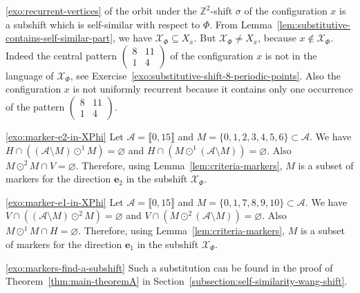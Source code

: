 \documentclass[12pt]{amsart}
\newcommand{\Z}{\mathbb{Z}}
\newcommand{\be}{{\boldsymbol{e}}}
\newcommand{\Acal}{\mathcal{A}} %
\newcommand{\Xcal}{\mathcal{X}} %
\newcommand{\Zrange}[1]{\llbracket0,#1\rrbracket}
\begin{document}
\begin{exosolution}{\ref{exo:recurrent-vertices}}
    of the orbit under the $\Z^2$-shift $\sigma$ of the configuration $x$
is a subshift which is self-similar with respect to $\Phi$.
From Lemma~\ref{lem:substitutive-contains-self-similar-part}, we have
$\Xcal_\Phi\subseteq X_x$. 
    But $\Xcal_\Phi\neq X_x$, because $x\notin\Xcal_\Phi$.
    Indeed the central pattern
$\left(\begin{smallmatrix}8&11\\1&4\end{smallmatrix}\right)$
    of the configuration $x$
    is not in the language of $\Xcal_\Phi$, see
Exercise~\ref{exo:substitutive-shift-8-periodic-points}.
Also the configuration $x$ is not uniformly recurrent because
it contains only one occurrence of the pattern
$\left(\begin{smallmatrix}8&11\\1&4\end{smallmatrix}\right)$.
\end{exosolution}

\begin{exosolution}{\ref{exo:marker-e2-in-XPhi}}
    Let $\Acal=\Zrange{15}$ and $M=\{0,1,2,3,4,5,6\}\subset\Acal$.
    We have $H\cap((\Acal\setminus M)\odot^1 M)=\varnothing$
    and     $H\cap( M\odot^1(\Acal\setminus M))=\varnothing$.
    Also $M\odot^2M\cap V=\varnothing$.
    Therefore, using Lemma~\ref{lem:criteria-markers},
    $M$ is a subset of markers for the direction $\be_2$ in
    the subshift $\Xcal_\Phi$.
\end{exosolution}

\begin{exosolution}{\ref{exo:marker-e1-in-XPhi}}
    Let $\Acal=\Zrange{15}$ and $M=\{0, 1, 7, 8, 9, 10\}\subset\Acal$.
    We have $V\cap((\Acal\setminus M)\odot^2 M)=\varnothing$
    and     $V\cap( M\odot^2(\Acal\setminus M))=\varnothing$.
    Also $M\odot^1M\cap H=\varnothing$.
    Therefore, using Lemma~\ref{lem:criteria-markers},
    $M$ is a subset of markers for the direction $\be_1$ in
    the subshift $\Xcal_\Phi$.
\end{exosolution}

\begin{exosolution}{\ref{exo:markers-find-a-subshift}}
    Such a substitution can be found in
    the proof of Theorem~\ref{thm:main-theoremA}
    in Section~\ref{subsection:self-similarity-wang-shift}.
\end{exosolution}
\end{document}
